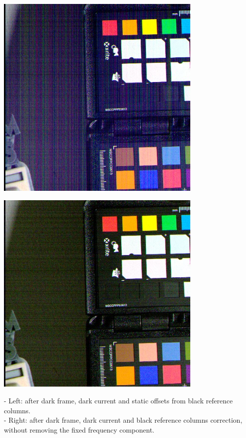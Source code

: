 \begin{center}
\includegraphics[height=10cm]{images/10ms+4-totally-raw-crop}
\end{center}

\begin{center}
\includegraphics[height=10cm]{images/10ms+4-no-blackcol-crop}
\end{center}

- Left: after dark frame, dark current and static offsets from black reference columns.\\
- Right: after dark frame, dark current and black reference columns correction, without removing the fixed frequency component.\\

